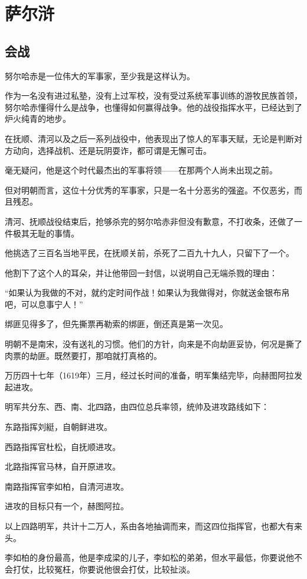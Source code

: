 \section{萨尔浒}
\ifnum{}
	\begin{multicols}{\theparacolNo}
\fi
\subsection{会战}
努尔哈赤是一位伟大的军事家，至少我是这样认为。

作为一名没有进过私塾，没有上过军校，没有受过系统军事训练的游牧民族首领，努尔哈赤懂得什么是战争，也懂得如何赢得战争。他的战役指挥水平，已经达到了炉火纯青的地步。

在抚顺、清河以及之后一系列战役中，他表现出了惊人的军事天赋，无论是判断对方动向，选择战机、还是玩阴耍诈，都可谓是无懈可击。

毫无疑问，他是这个时代最杰出的军事将领——在那两个人尚未出现之前。

但对明朝而言，这位十分优秀的军事家，只是一名十分恶劣的强盗。不仅恶劣，而且残忍。

清河、抚顺战役结束后，抢够杀完的努尔哈赤非但没有歉意，不打收条，还做了一件极其无耻的事情。

他挑选了三百名当地平民，在抚顺关前，杀死了二百九十九人，只留下了一个。

他割下了这个人的耳朵，并让他带回一封信，以说明自己无端杀戮的理由：

“如果认为我做的不对，就约定时间作战！如果认为我做得对，你就送金银布帛吧，可以息事宁人！”

绑匪见得多了，但先撕票再勒索的绑匪，倒还真是第一次见。

明朝不是南宋，没有送礼的习惯。他们的方针，向来是不向劫匪妥协，何况是撕了肉票的劫匪。既然要打，那咱就打真格的。

万历四十七年（1619年）三月，经过长时间的准备，明军集结完毕，向赫图阿拉发起进攻。

明军共分东、西、南、北四路，由四位总兵率领，统帅及进攻路线如下：

东路指挥刘綎，自朝鲜进攻。

西路指挥官杜松，自抚顺进攻。

北路指挥官马林，自开原进攻。

南路指挥官李如柏，自清河进攻。

进攻的目标只有一个，赫图阿拉。

以上四路明军，共计十二万人，系由各地抽调而来，而这四位指挥官，也都大有来头。

李如柏的身份最高，他是李成梁的儿子，李如松的弟弟，但水平最低，你要说他不会打仗，比较冤枉，你要说他很会打仗，比较扯淡。


\end{multicols}
